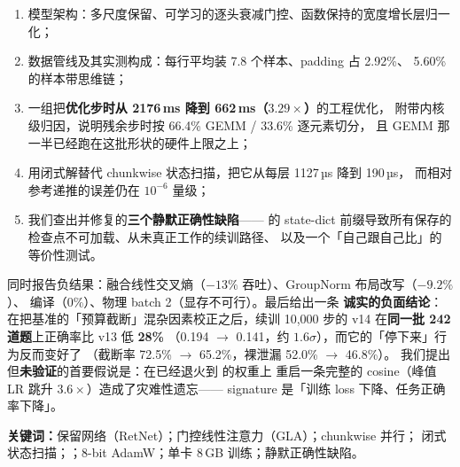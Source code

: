 \begin{enumerate}[label=（\chinese{enumi}）]
\item 模型架构：多尺度保留、可学习的逐头衰减门控、函数保持的宽度增长层归一化；
\item 数据管线及其实测构成：每行平均装 7.8 个样本、padding 占 2.92\%、
      5.60\% 的样本带思维链；
\item 一组把\textbf{优化步时从 2176\,ms 降到 662\,ms（$3.29\times$）}的工程优化，
      附带内核级归因，说明残余步时按 66.4\% GEMM / 33.6\% 逐元素切分，
      且 GEMM 那一半已经跑在这批形状的硬件上限之上；
\item 用闭式解替代 chunkwise 状态扫描，把它从每层 1127\,µs 降到 190\,µs，
      而相对参考递推的误差仍在 $10^{-6}$ 量级；
\item 我们查出并修复的\textbf{三个静默正确性缺陷}—— 的
      state-dict 前缀导致所有保存的检查点不可加载、从未真正工作的续训路径、
      以及一个「自己跟自己比」的等价性测试。
\end{enumerate}

同时报告负结果：融合线性交叉熵（$-13\%$ 吞吐）、GroupNorm 布局改写（$-9.2\%$）、
 编译（0\%）、物理 batch 2（显存不可行）。最后给出一条
\textbf{诚实的负面结论}：在把基准的「预算截断」混杂因素校正之后，续训
10{,}000 步的 v14 在\textbf{同一批 242 道题}上正确率比 v13 低 \textbf{28\%}
（0.194 $\rightarrow$ 0.141，约 $1.6\sigma$），而它的「停下来」行为反而变好了
（截断率 72.5\% $\rightarrow$ 65.2\%，裸泄漏 52.0\% $\rightarrow$ 46.8\%）。
我们提出但\textbf{未验证}的首要假说是：在已经退火到  的权重上
重启一条完整的 cosine（峰值 LR 跳升 $3.6\times$）造成了灾难性遗忘——
signature 是「训练 loss 下降、任务正确率下降」。

\bigskip

{\small\textbf{关键词：}保留网络（RetNet）；门控线性注意力（GLA）；chunkwise 并行；
闭式状态扫描；；8-bit AdamW；单卡 8\,GB 训练；静默正确性缺陷。}

\clearpage

\renewcommand{\contentsname}{目录}
\tableofcontents

\clearpage
